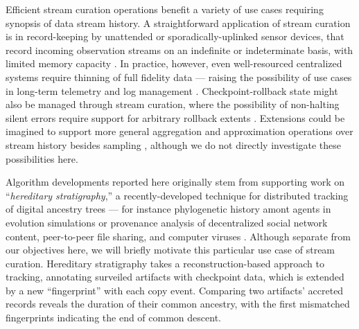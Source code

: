 Efficient stream curation operations benefit a variety of use cases requiring synopsis of data stream history.
A straightforward application of stream curation is in record-keeping by unattended or sporadically-uplinked sensor devices, that record incoming observation streams on an indefinite or indeterminate basis, with limited memory capacity \citep{jain2022survey}.
In practice, however, even well-resourced centralized systems require thinning of full fidelity data --- raising the possibility of use cases in long-term telemetry and log management \citep{kent2006guide,miebach2002hubble}.
Checkpoint-rollback state might also be managed through stream curation, where the possibility of non-halting silent errors require support for arbitrary rollback extents \citep{aupy2013combination}.
Extensions could be imagined to support more general aggregation and approximation operations over stream history besides sampling \citep{schoellhammer2024lightweight}, although we do not directly investigate these possibilities here.


Algorithm developments reported here originally stem from supporting work on ``\textit{hereditary stratigraphy},'' a recently-developed technique for distributed tracking of digital ancestry trees --- for instance phylogenetic history amont agents in evolution simulations or provenance analysis of decentralized social network content, peer-to-peer file sharing, and computer viruses \citep{moreno2022hereditary}.
Although separate from our objectives here, we will briefly motivate this particular use case of stream curation.
Hereditary stratigraphy takes a reconstruction-based approach to tracking, annotating surveiled artifacts with checkpoint data, which is extended by a new ``fingerprint'' with each copy event.
Comparing two artifacts' accreted records reveals the duration of their common ancestry, with the first mismatched fingerprints indicating the end of common descent.

